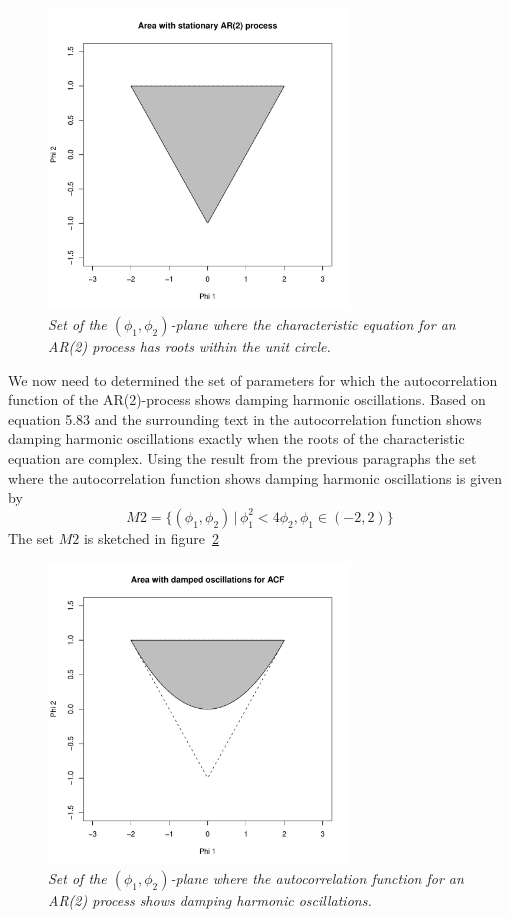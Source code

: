\begin{figure}
    \centering
    \includegraphics[width=80mm]{part1-stationary.pdf}
    \caption{\textit{Set of the $(\phi_1, \phi_2)$-plane where the characteristic equation for an AR(2) process has roots within the unit circle.}}
    \label{fig:part1-stationary}
\end{figure}

We now need to determined the set of parameters for which the autocorrelation function of the AR(2)-process shows damping harmonic oscillations. Based on equation 5.83 and the surrounding text in \cite{hm} the autocorrelation function shows damping harmonic oscillations exactly when the roots of the characteristic equation are complex. Using the result from the previous paragraphs the set where the autocorrelation function shows damping harmonic oscillations is given by
\begin{equation*}
    M2 = \{(\phi_1, \phi_2) \,|\, \phi_1^2<4\phi_2, \phi_1\in(-2,2)\}
\end{equation*}
The set $M2$ is sketched in figure~\ref{fig:part1-damping}

\begin{figure}
    \centering
    \includegraphics[width=80mm]{part1-damping.pdf}
    \caption{\textit{Set of the $(\phi_1, \phi_2)$-plane where the autocorrelation function for an AR(2) process shows damping harmonic oscillations.}}
    \label{fig:part1-damping}
\end{figure}

